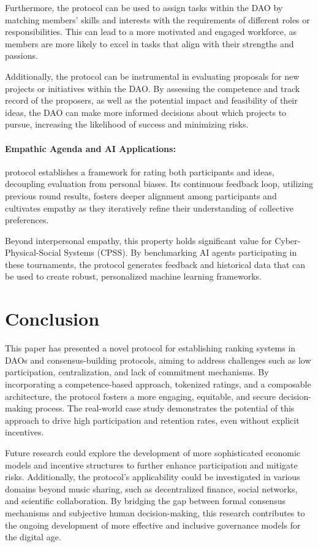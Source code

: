 \documentclass{article}
\begin{document}
\begin{CJK}{UTF8}{gbsn}
\begin{multicols}{2}
        Furthermore, the protocol can be used to assign tasks within the DAO by matching members' skills and interests with the requirements of different roles or responsibilities. This can lead to a more motivated and engaged workforce, as members are more likely to excel in tasks that align with their strengths and passions.

        Additionally, the protocol can be instrumental in evaluating proposals for new projects or initiatives within the DAO. By assessing the competence and track record of the proposers, as well as the potential impact and feasibility of their ideas, the DAO can make more informed decisions about which projects to pursue, increasing the likelihood of success and minimizing risks.

        \paragraph*{Empathic Agenda and AI Applications:} protocol establishes a framework for rating both participants and ideas, decoupling evaluation from personal biases. Its continuous feedback loop, utilizing previous round results, fosters deeper alignment among participants and cultivates empathy as they iteratively refine their understanding of collective preferences.

        Beyond interpersonal empathy, this property holds significant value for Cyber-Physical-Social Systems (CPSS). By benchmarking AI agents participating in these tournaments, the protocol generates feedback and historical data that can be used to create robust, personalized machine learning frameworks.

        \section{Conclusion}

        This paper has presented a novel protocol for establishing ranking systems in DAOs and consensus-building protocols, aiming to address challenges such as low participation, centralization, and lack of commitment mechanisms. By incorporating a competence-based approach, tokenized ratings, and a composable architecture, the protocol fosters a more engaging, equitable, and secure decision-making process. The real-world case study demonstrates the potential of this approach to drive high participation and retention rates, even without explicit incentives.

        Future research could explore the development of more sophisticated economic models and incentive structures to further enhance participation and mitigate risks. Additionally, the protocol's applicability could be investigated in various domains beyond music sharing, such as decentralized finance, social networks, and scientific collaboration. By bridging the gap between formal consensus mechanisms and subjective human decision-making, this research contributes to the ongoing development of more effective and inclusive governance models for the digital age.




\end{multicols}
\end{CJK}
\end{document}
